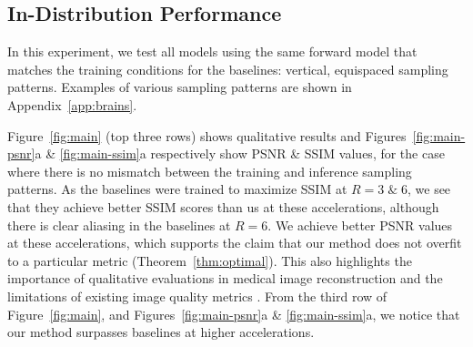 \documentclass{article}
\begin{document}
\subsection{In-Distribution Performance}
In this experiment, we test all models using the same forward model that matches the training conditions for the baselines: vertical, equispaced sampling patterns. Examples of various sampling patterns are shown in Appendix~\ref{app:brains}.

Figure~\ref{fig:main} (top three rows) shows qualitative results and Figures~\ref{fig:main-psnr}a \& \ref{fig:main-ssim}a respectively show PSNR \& SSIM values, for the case where there is no mismatch between the training and inference sampling patterns.
As the baselines were trained to maximize SSIM at $R=3\;\&\;6$, we see that they achieve better SSIM scores than us at these accelerations, although there is clear aliasing in the baselines at $R=6$. We achieve better PSNR values at these accelerations, which supports the claim that our method does not overfit to a particular metric (Theorem~\ref{thm:optimal}).
This also highlights the importance of qualitative evaluations in medical image reconstruction and the limitations of existing image quality metrics \cite{mason2019comparison}.
From the third row of Figure~\ref{fig:main}, and Figures~\ref{fig:main-psnr}a \& \ref{fig:main-ssim}a, we notice that our method surpasses baselines at higher accelerations. 
\end{document}

